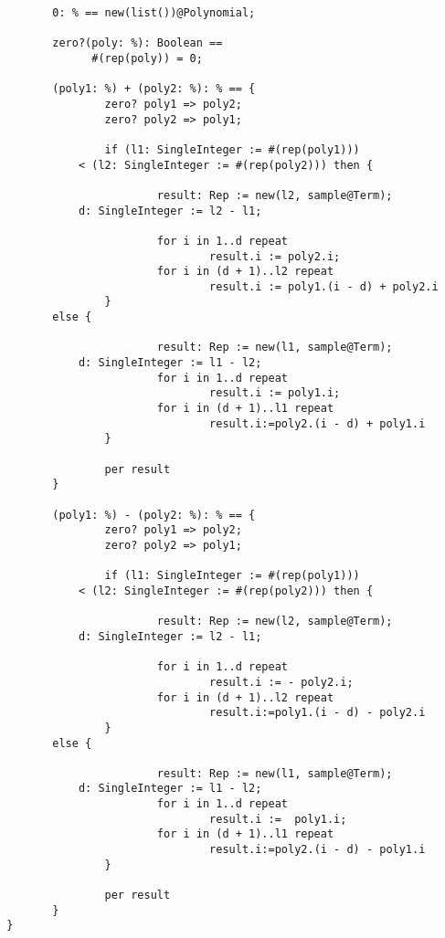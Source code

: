 \begin{small}
\begin{verbatim}
        0: % == new(list())@Polynomial;

        zero?(poly: %): Boolean == 
              #(rep(poly)) = 0;

        (poly1: %) + (poly2: %): % == {
                zero? poly1 => poly2;
                zero? poly2 => poly1;

                if (l1: SingleInteger := #(rep(poly1)))
		    < (l2: SingleInteger := #(rep(poly2))) then {

                        result: Rep := new(l2, sample@Term);
			d: SingleInteger := l2 - l1;

                        for i in 1..d repeat 
                                result.i := poly2.i;
                        for i in (d + 1)..l2 repeat 
                                result.i := poly1.(i - d) + poly2.i
                }
		else {

                        result: Rep := new(l1, sample@Term);
			d: SingleInteger := l1 - l2;
                        for i in 1..d repeat 
                                result.i := poly1.i;
                        for i in (d + 1)..l1 repeat 
                                result.i:=poly2.(i - d) + poly1.i
                }

                per result
        }

        (poly1: %) - (poly2: %): % == {
                zero? poly1 => poly2;
                zero? poly2 => poly1;

                if (l1: SingleInteger := #(rep(poly1)))
		    < (l2: SingleInteger := #(rep(poly2))) then {

                        result: Rep := new(l2, sample@Term);
			d: SingleInteger := l2 - l1;

                        for i in 1..d repeat 
                                result.i := - poly2.i;
                        for i in (d + 1)..l2 repeat 
                                result.i:=poly1.(i - d) - poly2.i
                }
		else {

                        result: Rep := new(l1, sample@Term);
			d: SingleInteger := l1 - l2;
                        for i in 1..d repeat 
                                result.i :=  poly1.i;
                        for i in (d + 1)..l1 repeat 
                                result.i:=poly2.(i - d) - poly1.i
                }

                per result
        }
 }

\end{verbatim}
\end{small}

